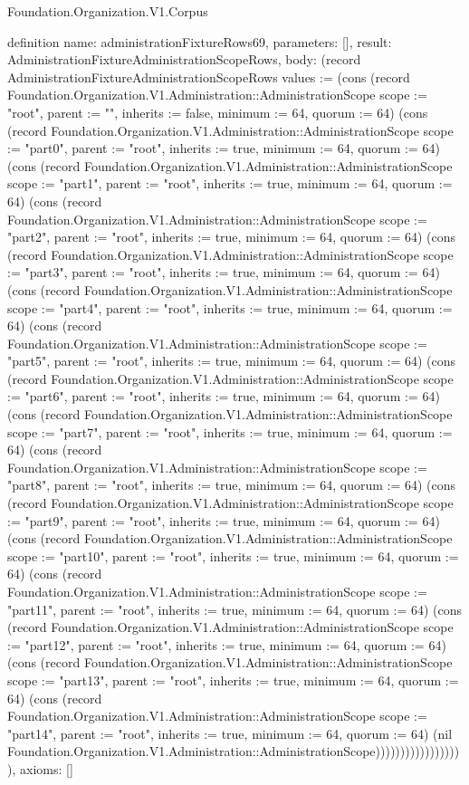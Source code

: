\begin{lexlean}{Foundation.Organization.V1.Corpus}
\begin{semanticmodule}
definition{
  name: administrationFixtureRows69,
  parameters: [],
  result: AdministrationFixtureAdministrationScopeRows,
  body: (record AdministrationFixtureAdministrationScopeRows {values := (cons (record Foundation.Organization.V1.Administration::AdministrationScope {scope := "root", parent := "", inherits := false, minimum := 64, quorum := 64}) (cons (record Foundation.Organization.V1.Administration::AdministrationScope {scope := "part0", parent := "root", inherits := true, minimum := 64, quorum := 64}) (cons (record Foundation.Organization.V1.Administration::AdministrationScope {scope := "part1", parent := "root", inherits := true, minimum := 64, quorum := 64}) (cons (record Foundation.Organization.V1.Administration::AdministrationScope {scope := "part2", parent := "root", inherits := true, minimum := 64, quorum := 64}) (cons (record Foundation.Organization.V1.Administration::AdministrationScope {scope := "part3", parent := "root", inherits := true, minimum := 64, quorum := 64}) (cons (record Foundation.Organization.V1.Administration::AdministrationScope {scope := "part4", parent := "root", inherits := true, minimum := 64, quorum := 64}) (cons (record Foundation.Organization.V1.Administration::AdministrationScope {scope := "part5", parent := "root", inherits := true, minimum := 64, quorum := 64}) (cons (record Foundation.Organization.V1.Administration::AdministrationScope {scope := "part6", parent := "root", inherits := true, minimum := 64, quorum := 64}) (cons (record Foundation.Organization.V1.Administration::AdministrationScope {scope := "part7", parent := "root", inherits := true, minimum := 64, quorum := 64}) (cons (record Foundation.Organization.V1.Administration::AdministrationScope {scope := "part8", parent := "root", inherits := true, minimum := 64, quorum := 64}) (cons (record Foundation.Organization.V1.Administration::AdministrationScope {scope := "part9", parent := "root", inherits := true, minimum := 64, quorum := 64}) (cons (record Foundation.Organization.V1.Administration::AdministrationScope {scope := "part10", parent := "root", inherits := true, minimum := 64, quorum := 64}) (cons (record Foundation.Organization.V1.Administration::AdministrationScope {scope := "part11", parent := "root", inherits := true, minimum := 64, quorum := 64}) (cons (record Foundation.Organization.V1.Administration::AdministrationScope {scope := "part12", parent := "root", inherits := true, minimum := 64, quorum := 64}) (cons (record Foundation.Organization.V1.Administration::AdministrationScope {scope := "part13", parent := "root", inherits := true, minimum := 64, quorum := 64}) (cons (record Foundation.Organization.V1.Administration::AdministrationScope {scope := "part14", parent := "root", inherits := true, minimum := 64, quorum := 64}) (nil Foundation.Organization.V1.Administration::AdministrationScope)))))))))))))))))}),
  axioms: []
}


\end{semanticmodule}
\end{lexlean}
